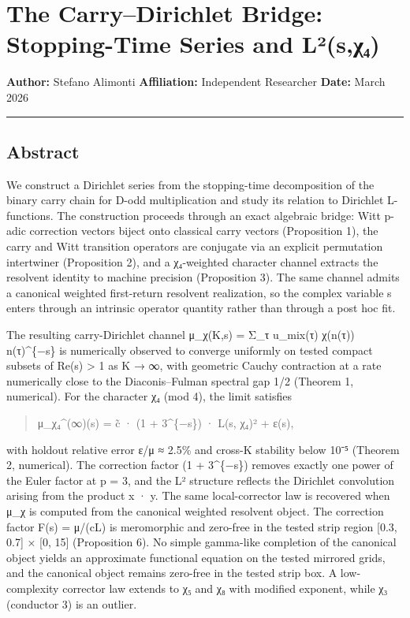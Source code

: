 \documentclass[
  11pt,
]{article}
\author{Stefano Alimonti --- stefalimonti@gmail.com}
\date{March 2026}
\begin{document}
{
\hypersetup{linkcolor=black}
\setcounter{tocdepth}{2}
\tableofcontents
}
\section{The Carry--Dirichlet Bridge: Stopping-Time Series and
L²(s,χ₄)}\label{the-carrydirichlet-bridge-stopping-time-series-and-luxb2sux3c7ux2084}

\textbf{Author:} Stefano Alimonti \textbf{Affiliation:} Independent Researcher
\textbf{Date:} March 2026

\begin{center}\rule{0.5\linewidth}{0.5pt}\end{center}

\newpage

\subsection{Abstract}\label{abstract}

We construct a Dirichlet series from the stopping-time decomposition of the
binary carry chain for D-odd multiplication and study its relation to Dirichlet
L-functions. The construction proceeds through an exact algebraic bridge: Witt
p-adic correction vectors biject onto classical carry vectors (Proposition 1),
the carry and Witt transition operators are conjugate via an explicit
permutation intertwiner (Proposition 2), and a χ₄-weighted character channel
extracts the resolvent identity to machine precision (Proposition 3). The same
channel admits a canonical weighted first-return resolvent realization, so the
complex variable s enters through an intrinsic operator quantity rather than
through a post hoc fit.

The resulting carry-Dirichlet channel μ\_χ(K,s) = Σ\_τ u\_mix(τ) χ(n(τ))
n(τ)\^{}\{−s\} is numerically observed to converge uniformly on tested compact
subsets of Re(s) \textgreater{} 1 as K → ∞, with geometric Cauchy contraction at
a rate numerically close to the Diaconis--Fulman spectral gap 1/2 (Theorem 1,
numerical). For the character χ₄ (mod 4), the limit satisfies

\begin{quote}
μ\_χ₄\^{}(∞)(s) = c̃ · (1 + 3\^{}\{−s\}) · L(s, χ₄)² + ε(s),
\end{quote}

with holdout relative error \textbar ε\textbar/\textbar μ\textbar{} ≈ 2.5\% and
cross-K stability below 10⁻⁵ (Theorem 2, numerical). The correction factor (1 +
3\^{}\{−s\}) removes exactly one power of the Euler factor at p = 3, and the L²
structure reflects the Dirichlet convolution arising from the product x · y. The
same local-corrector law is recovered when μ\_χ is computed from the canonical
weighted resolvent object. The correction factor F(s) = μ/(cL) is meromorphic
and zero-free in the tested strip region {[}0.3, 0.7{]} × {[}0, 15{]}
(Proposition 6). No simple gamma-like completion of the canonical object yields
an approximate functional equation on the tested mirrored grids, and the
canonical object remains zero-free in the tested strip box. A low-complexity
corrector law extends to χ₅ and χ₈ with modified exponent, while χ₃ (conductor
3) is an outlier.
\end{document}
